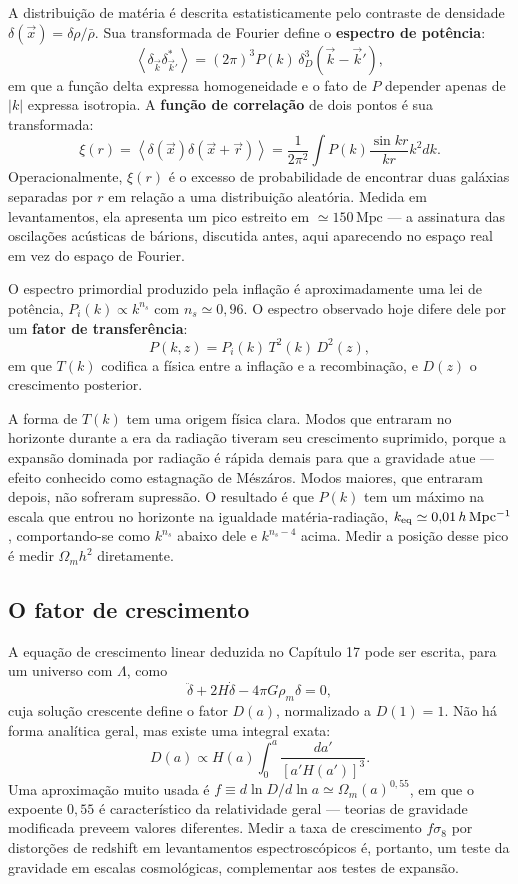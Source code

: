 \documentclass[11pt,a4paper]{article}
\begin{document}
A distribuição de matéria é descrita estatisticamente pelo contraste de densidade $\delta(\vec{x})=\delta\rho/\bar{\rho}$. Sua transformada de Fourier define o \textbf{espectro de potência}:
\[
\left\langle\delta_{\vec{k}}\delta^{*}_{\vec{k}'}\right\rangle=(2\pi)^{3}P(k)\,\delta^{3}_{D}(\vec{k}-\vec{k}'),
\]
em que a função delta expressa homogeneidade e o fato de $P$ depender apenas de $|k|$ expressa isotropia. A \textbf{função de correlação} de dois pontos é sua transformada:
\[
\xi(r)=\left\langle\delta(\vec{x})\delta(\vec{x}+\vec{r})\right\rangle
=\frac{1}{2\pi^{2}}\int P(k)\frac{\sin kr}{kr}k^{2}dk.
\]
Operacionalmente, $\xi(r)$ é o excesso de probabilidade de encontrar duas galáxias separadas por $r$ em relação a uma distribuição aleatória. Medida em levantamentos, ela apresenta um pico estreito em $\simeq150\,\mathrm{Mpc}$ --- a assinatura das oscilações acústicas de bárions, discutida antes, aqui aparecendo no espaço real em vez do espaço de Fourier.

O espectro primordial produzido pela inflação é aproximadamente uma lei de potência, $P_i(k)\propto k^{n_s}$ com $n_s\simeq0{,}96$. O espectro observado hoje difere dele por um \textbf{fator de transferência}:
\[
P(k,z)=P_i(k)\,T^{2}(k)\,D^{2}(z),
\]
em que $T(k)$ codifica a física entre a inflação e a recombinação, e $D(z)$ o crescimento posterior.

A forma de $T(k)$ tem uma origem física clara. Modos que entraram no horizonte durante a era da radiação tiveram seu crescimento suprimido, porque a expansão dominada por radiação é rápida demais para que a gravidade atue --- efeito conhecido como estagnação de Mészáros. Modos maiores, que entraram depois, não sofreram supressão. O resultado é que $P(k)$ tem um máximo na escala que entrou no horizonte na igualdade matéria-radiação, $k_{\rm eq}\simeq0{,}01\,h\,\mathrm{Mpc^{-1}}$, comportando-se como $k^{n_s}$ abaixo dele e $k^{n_s-4}$ acima. Medir a posição desse pico é medir $\Omega_mh^{2}$ diretamente.

\subsection*{O fator de crescimento}

A equação de crescimento linear deduzida no Capítulo 17 pode ser escrita, para um universo com $\Lambda$, como
\[
\ddot{\delta}+2H\dot{\delta}-4\pi G\rho_m\delta=0,
\]
cuja solução crescente define o fator $D(a)$, normalizado a $D(1)=1$. Não há forma analítica geral, mas existe uma integral exata:
\[
D(a)\propto H(a)\int_0^{a}\frac{da'}{\left[a'H(a')\right]^{3}}.
\]
Uma aproximação muito usada é $f\equiv d\ln D/d\ln a\simeq\Omega_m(a)^{0{,}55}$, em que o expoente $0{,}55$ é característico da relatividade geral --- teorias de gravidade modificada preveem valores diferentes. Medir a taxa de crescimento $f\sigma_8$ por distorções de redshift em levantamentos espectroscópicos é, portanto, um teste da gravidade em escalas cosmológicas, complementar aos testes de expansão.
\end{document}
